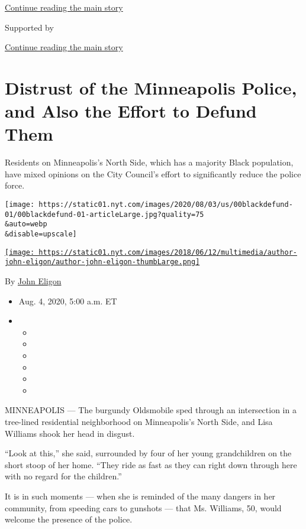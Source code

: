 \protect\hyperlink{after-top}{Continue reading the main story}

Supported by

\protect\hyperlink{after-sponsor}{Continue reading the main story}

\hypertarget{distrust-of-the-minneapolis-police-and-also-the-effort-to-defund-them}{%
\section{Distrust of the Minneapolis Police, and Also the Effort to
Defund
Them}\label{distrust-of-the-minneapolis-police-and-also-the-effort-to-defund-them}}

Residents on Minneapolis's North Side, which has a majority Black
population, have mixed opinions on the City Council's effort to
significantly reduce the police force.

\texttt{[image: https://static01.nyt.com/images/2020/08/03/us/00blackdefund-01/00blackdefund-01-articleLarge.jpg?quality=75\\\&auto=webp\\\&disable=upscale]}

\href{https://www.nytimes.com/by/john-eligon}{\texttt{[image: https://static01.nyt.com/images/2018/06/12/multimedia/author-john-eligon/author-john-eligon-thumbLarge.png]}}

By \href{https://www.nytimes.com/by/john-eligon}{John Eligon}

\begin{itemize}
\item
  Aug. 4, 2020, 5:00 a.m. ET
\item
  \begin{itemize}
  \item
  \item
  \item
  \item
  \item
  \item
  \end{itemize}
\end{itemize}

MINNEAPOLIS --- The burgundy Oldsmobile sped through an intersection in
a tree-lined residential neighborhood on Minneapolis's North Side, and
Lisa Williams shook her head in disgust.

``Look at this,'' she said, surrounded by four of her young
grandchildren on the short stoop of her home. ``They ride as fast as
they can right down through here with no regard for the children.''

It is in such moments --- when she is reminded of the many dangers in
her community, from speeding cars to gunshots --- that Ms. Williams, 50,
would welcome the presence of the police.

